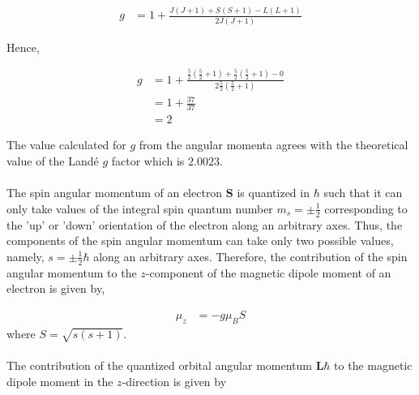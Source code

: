\documentclass[a4paper,11pt]{article}
\begin{document}
\begin{align}
g	& = 1 + \frac{J(J+1) + S(S+1) - L(L+1)}{2J(J+1)}
\end{align}

Hence,

\begin{align}
g	& = 1 + \frac{\frac{5}{2}(\frac{5}{2}+1)+\frac{5}{2}(\frac{5}{2}+1)-0}{2\frac{5}{2}(\frac{5}{2}+1)}\nonumber\\
	& = 1 + \frac{37}{37}\nonumber\\
	& = 2\nonumber 
\end{align}

The value calculated for $g$ from the angular momenta agrees with the theoretical value of the Land\'{e} $g$ factor which is $2.0023$\cite{mohling1982}.\\
\\
The spin angular momentum of an electron $\mathbf{S}$ is quantized in $\hbar$ such that it can only take values of the integral spin quantum number $m_s = \pm \frac{1}{2}$ corresponding to the 'up' or 'down' orientation of the electron along an arbitrary axes\cite{coey2010}. Thus, the components of the spin angular momentum can take only two possible values, namely, $s = \pm\frac{1}{2}\hbar$ along an arbitrary axes. Therefore, the contribution of the spin angular momentum to the $z$-component of the magnetic dipole moment of an electron is given by,

\begin{align}
\mu_z	& = -g \mu_B S
\end{align}    
where $S=\sqrt{s(s+1)}$.\\
\\
The contribution of the quantized orbital angular momentum $\mathbf{L}\hbar$ to the magnetic dipole moment in the $z$-direction is given by
\end{document}
